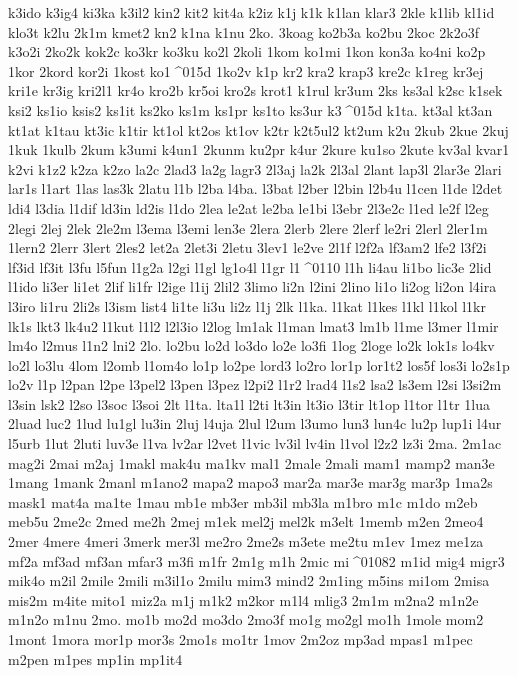 {k3ido
k3ig4
ki3ka
k3il2
kin2
kit2
kit4a
k2iz
k1j
k1k
k1lan
klar3
2kle
k1lib
kl1id
klo3t
k2lu
2k1m
kmet2
kn2
k1na
k1nu
2ko.
3koag
ko2b3a
ko2bu
2koc
2k2o3f
k3o2i
2ko2k
kok2c
ko3kr
ko3ku
ko2l
2koli
1kom
ko1mi
1kon
kon3a
ko4ni
ko2p
1kor
2kord
kor2i
1kost
ko1^^^^015d
1ko2v
k1p
kr2
kra2
krap3
kre2c
k1reg
kr3ej
kri1e
kr3ig
kri2l1
kr4o
kro2b
kr5oi
kro2s
krot1
k1rul
kr3um
2ks
ks3al
k2sc
k1sek
ksi2
ks1io
ksis2
ks1it
ks2ko
ks1m
ks1pr
ks1to
ks3ur
k3^^^^015d
k1ta.
kt3al
kt3an
kt1at
k1tau
kt3ic
k1tir
kt1ol
kt2os
kt1ov
k2tr
k2t5ul2
kt2um
k2u
2kub
2kue
2kuj
1kuk
1kulb
2kum
k3umi
k4un1
2kunm
ku2pr
k4ur
2kure
ku1so
2kute
kv3al
kvar1
k2vi
k1z2
k2za
k2zo
la2c
2lad3
la2g
lagr3
2l3aj
la2k
2l3al
2lant
lap3l
2lar3e
2lari
lar1s
l1art
1las
las3k
2latu
l1b
l2ba
l4ba.
l3bat
l2ber
l2bin
l2b4u
l1cen
l1de
l2det
ldi4
l3dia
l1dif
ld3in
ld2is
l1do
2lea
le2at
le2ba
le1bi
l3ebr
2l3e2c
l1ed
le2f
l2eg
2legi
2lej
2lek
2le2m
l3ema
l3emi
len3e
2lera
2lerb
2lere
2lerf
le2ri
2lerl
2ler1m
1lern2
2lerr
3lert
2les2
let2a
2let3i
2letu
3lev1
le2ve
2l1f
l2f2a
lf3am2
lfe2
l3f2i
lf3id
lf3it
l3fu
l5fun
l1g2a
l2gi
l1gl
lg1o4l
l1gr
l1^^^^0110
l1h
li4au
li1bo
lic3e
2lid
l1ido
li3er
li1et
2lif
li1fr
l2ige
l1ij
2lil2
3limo
li2n
l2ini
2lino
li1o
li2og
li2on
l4ira
l3iro
li1ru
2li2s
l3ism
list4
li1te
li3u
li2z
l1j
2lk
l1ka.
l1kat
l1kes
l1kl
l1kol
l1kr
lk1s
lkt3
lk4u2
l1kut
l1l2
l2l3io
l2log
lm1ak
l1man
lmat3
lm1b
l1me
l3mer
l1mir
lm4o
l2mus
l1n2
lni2
2lo.
lo2bu
lo2d
lo3do
lo2e
lo3fi
1log
2loge
lo2k
lok1s
lo4kv
lo2l
lo3lu
4lom
l2omb
l1om4o
lo1p
lo2pe
lord3
lo2ro
lor1p
lor1t2
los5f
los3i
lo2s1p
lo2v
l1p
l2pan
l2pe
l3pel2
l3pen
l3pez
l2pi2
l1r2
lrad4
l1s2
lsa2
ls3em
l2si
l3si2m
l3sin
lsk2
l2so
l3soc
l3soi
2lt
l1ta.
lta1l
l2ti
lt3in
lt3io
l3tir
lt1op
l1tor
l1tr
1lua
2luad
luc2
1lud
lu1gl
lu3in
2luj
l4uja
2lul
l2um
l3umo
lun3
lun4c
lu2p
lup1i
l4ur
l5urb
1lut
2luti
luv3e
l1va
lv2ar
l2vet
l1vic
lv3il
lv4in
l1vol
l2z2
lz3i
2ma.
2m1ac
mag2i
2mai
m2aj
1makl
mak4u
ma1kv
mal1
2male
2mali
mam1
mamp2
man3e
1mang
1mank
2manl
m1ano2
mapa2
mapo3
mar2a
mar3e
mar3g
mar3p
1ma2s
mask1
mat4a
ma1te
1mau
mb1e
mb3er
mb3il
mb3la
m1bro
m1c
m1do
m2eb
meb5u
2me2c
2med
me2h
2mej
m1ek
mel2j
mel2k
m3elt
1memb
m2en
2meo4
2mer
4mere
4meri
3merk
mer3l
me2ro
2me2s
m3ete
me2tu
m1ev
1mez
me1za
mf2a
mf3ad
mf3an
mfar3
m3fi
m1fr
2m1g
m1h
2mic
mi^^^^01082
m1id
mig4
migr3
mik4o
m2il
2mile
2mili
m3il1o
2milu
mim3
mind2
2m1ing
m5ins
mi1om
2misa
mis2m
m4ite
mito1
miz2a
m1j
m1k2
m2kor
m1l4
mlig3
2m1m
m2na2
m1n2e
m1n2o
m1nu
2mo.
mo1b
mo2d
mo3do
2mo3f
mo1g
mo2gl
mo1h
1mole
mom2
1mont
1mora
mor1p
mor3s
2mo1s
mo1tr
1mov
2m2oz
mp3ad
mpas1
m1pec
m2pen
m1pes
mp1in
mp1it4
}
